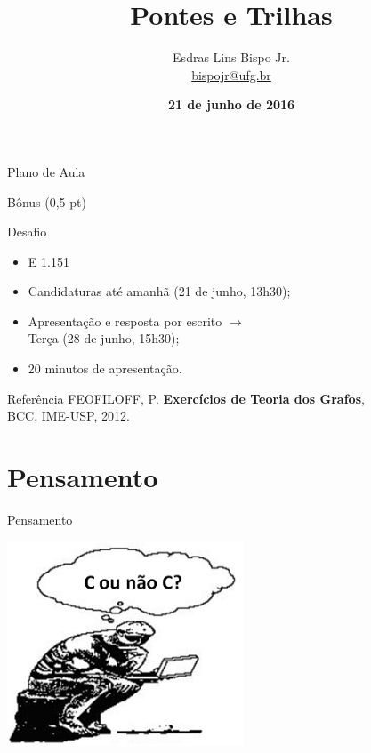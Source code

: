 \documentclass[xcolor=dvipsnames,table]{beamer}
\title{Pontes e Trilhas}
\author{
  Esdras Lins Bispo Jr. \\ \url{bispojr@ufg.br}
  }
\institute{
  Teoria de Grafos \\Bacharelado em Ciência da Computação}
\date{\textbf{21 de junho de 2016} }
\begin{document}
	\begin{frame}
		\titlepage
	\end{frame}

	\AtBeginSection{
		\begin{frame}{Sumário}%
    		\tableofcontents[currentsection]
		\end{frame}
	}

	\begin{frame}{Plano de Aula}
		\tableofcontents
	\end{frame}
	
	\begin{frame}{Bônus (0,5 pt)}
		\begin{block}{Desafio}
			\begin{itemize}
				\item {E 1.151} 
                \item Candidaturas até amanhã (21 de junho, 13h30); 
                \item Apresentação e resposta por escrito $\rightarrow$ \\Terça (28 de junho, 15h30); 
                \item 20 minutos de apresentação.
			\end{itemize}
		\end{block}
        \begin{block}{Referência}
			FEOFILOFF, P. {\bf Exercícios de Teoria dos Grafos}, \\
			BCC, IME-USP, 2012. 
		\end{block}	
	\end{frame}
	
	\section{Pensamento}
	\begin{frame}{Pensamento}
  		\begin{center}
    		\includegraphics[width=7cm]{images/pensamento.png}
  		\end{center}
	\end{frame}
	
\end{document}
